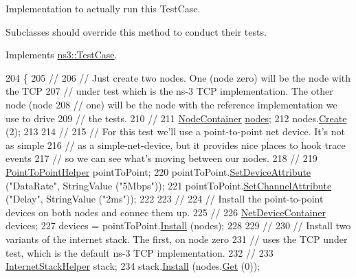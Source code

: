 Implementation to actually run this Test\+Case. 

Subclasses should override this method to conduct their tests. 

Implements \hyperlink{classns3_1_1TestCase_a8ff74680cf017ed42011e4be51917a24}{ns3\+::\+Test\+Case}.


\begin{DoxyCode}
204 \{
205   \textcolor{comment}{//}
206   \textcolor{comment}{// Just create two nodes.  One (node zero) will be the node with the TCP}
207   \textcolor{comment}{// under test which is the ns-3 TCP implementation.  The other node (node}
208   \textcolor{comment}{// one) will be the node with the reference implementation we use to drive}
209   \textcolor{comment}{// the tests.}
210   \textcolor{comment}{//}
211   \hyperlink{classns3_1_1NodeContainer}{NodeContainer} \hyperlink{visualizer-ideas_8txt_a3e1b3808014a2c68ab0cd0182e041be2}{nodes};
212   nodes.\hyperlink{classns3_1_1NodeContainer_a787f059e2813e8b951cc6914d11dfe69}{Create} (2);
213 
214   \textcolor{comment}{//}
215   \textcolor{comment}{// For this test we'll use a point-to-point net device.  It's not as simple}
216   \textcolor{comment}{// as a simple-net-device, but it provides nice places to hook trace events}
217   \textcolor{comment}{// so we can see what's moving between our nodes.}
218   \textcolor{comment}{//}
219   \hyperlink{classns3_1_1PointToPointHelper}{PointToPointHelper} pointToPoint;
220   pointToPoint.\hyperlink{classns3_1_1PointToPointHelper_a4577f5ab8c387e5528af2e0fbab1152e}{SetDeviceAttribute} (\textcolor{stringliteral}{"DataRate"}, StringValue (\textcolor{stringliteral}{"5Mbps"}));
221   pointToPoint.\hyperlink{classns3_1_1PointToPointHelper_a6b5317fd17fb61e5a53f8d66a90b63b9}{SetChannelAttribute} (\textcolor{stringliteral}{"Delay"}, StringValue (\textcolor{stringliteral}{"2ms"}));
222 
223   \textcolor{comment}{//}
224   \textcolor{comment}{// Install the point-to-point devices on both nodes and connec them up.}
225   \textcolor{comment}{//}
226   \hyperlink{classns3_1_1NetDeviceContainer}{NetDeviceContainer} devices;
227   devices = pointToPoint.\hyperlink{classns3_1_1PointToPointHelper_ab9162fea3e88722666fed1106df1f9ec}{Install} (nodes);
228 
229   \textcolor{comment}{//}
230   \textcolor{comment}{// Install two variants of the internet stack.  The first, on node zero }
231   \textcolor{comment}{// uses the TCP under test, which is the default ns-3 TCP implementation.}
232   \textcolor{comment}{//}
233   \hyperlink{classns3_1_1InternetStackHelper}{InternetStackHelper} stack;
234   stack.\hyperlink{classns3_1_1InternetStackHelper_a6645b412f31283d2d9bc3d8a95cebbc0}{Install} (nodes.\hyperlink{classns3_1_1NodeContainer_a9ed96e2ecc22e0f5a3d4842eb9bf90bf}{Get} (0));

\end{DoxyCode}
